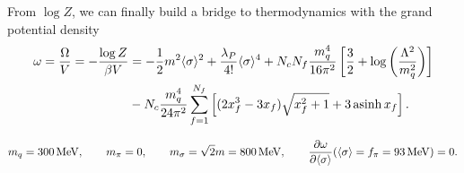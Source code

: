 From $\log Z$, we can finally build a bridge to thermodynamics with the grand potential density
\begin{equation}
\begin{split}
	\omega = \frac{\Omega}{V} = -\frac{\log Z}{\beta V} &= -\frac12 m^2 \langle \sigma \rangle^2 + \frac{\lambda_P}{4!} \langle \sigma \rangle^4 + N_c N_f \frac{m_q^4}{16 \pi^2} \left[ \frac{3}{2} + \log\left(\frac{{\Lambda}^2}{m_q^2}\right) \right] \\
	                                                    &- N_c \frac{m_q^4}{24 \pi^2} \sum_{f=1}^{N_f} \left[ (2 x_f^3 - 3x_f) \sqrt{x_f^2 + 1} + 3 \operatorname{asinh} x_f \right] .
\end{split}
\end{equation}








\begin{equation}
	m_q = \SI{300}{\mega\electronvolt}, \qquad
	m_\pi = 0, \qquad
	m_\sigma = \sqrt{2} m = \SI{800}{\mega\electronvolt}, \qquad
	\pdv{\omega}{ \langle \sigma \rangle}(\langle \sigma \rangle=f_\pi=\SI{93}{\mega\electronvolt}) = 0 .
\end{equation}

\iffalse
\begin{figure}
\tikzsetnextfilename{grand-potential}
\begin{tikzpicture}
\begin{axis}[
	xmin = 0, xmax = 200, ymin=-100, ymax=+500,
	declare function={
		Nc = 3;
		Nf = 2;
		msigma = 800;
		mpi = 0;
		mq0 = 300;
		m = sqrt(2)*msigma;
		fpi = 93;
		h = fpi * mpi^2;
		g = mq0 / fpi;
		mq(\sigma) = g * \sigma;
		lambda = 6*m^2 / fpi^2;
		Lambda = mq0 / sqrt(e);
		x(\sigma,\mu) = sqrt((\mu)^2/(mq(\sigma))^2 - 1);
		asinh(\y) = ln(\y + sqrt((\y)^2+1));
		v0(\sigma) = -1/2*m^2*(\sigma)^2 + lambda/24*(\sigma)^4 - h*\sigma; %
		vr(\sigma) = Nc*Nf*(mq(\sigma))^4/(16*pi^2)*(3/2+ln(Lambda^2 / (mq(\sigma))^2)); %
		vf(\sigma,\mu) = -Nc*(mq(\sigma))^4/(24*pi^2) * ( (2*(x(\sigma,\mu))^3-3*x(\sigma,\mu))*sqrt((x(\sigma,\mu))^2+1) + 3*asinh(x(\sigma,\mu)) ); %
		v(\sigma,\mu) = v0(\sigma) + vr(\sigma); %
	},
]
\addplot [domain=0:200] {v(x,0) / fpi^4};
\end{axis}
\end{tikzpicture}
\end{figure}
\fi

